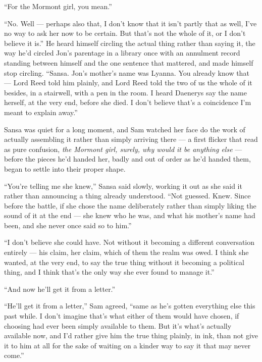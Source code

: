 “For the Mormont girl, you mean.”

“No. Well — perhaps also that, I don’t know that it isn’t partly that as well, I’ve no way to ask her now to be certain. But that’s not the whole of it, or I don’t believe it is.” He heard himself circling the actual thing rather than saying it, the way he’d circled Jon’s parentage in a library once with an annulment record standing between himself and the one sentence that mattered, and made himself stop circling. “Sansa. Jon’s mother’s name was Lyanna. You already know that — Lord Reed told him plainly, and Lord Reed told the two of us the whole of it besides, in a stairwell, with a pen in the room. I heard Daenerys say the name herself, at the very end, before she died. I don’t believe that’s a coincidence I’m meant to explain away.”

Sansa was quiet for a long moment, and Sam watched her face do the work of actually assembling it rather than simply arriving there — a first flicker that read as pure confusion, \textit{the Mormont girl, surely, why would it be anything else} — before the pieces he’d handed her, badly and out of order as he’d handed them, began to settle into their proper shape.

“You’re telling me she knew,” Sansa said slowly, working it out as she said it rather than announcing a thing already understood. “Not guessed. Knew. Since before the battle, if she chose the name deliberately rather than simply liking the sound of it at the end — she knew who he was, and what his mother’s name had been, and she never once said so to him.”

“I don’t believe she could have. Not without it becoming a different conversation entirely — his claim, her claim, which of them the realm was owed. I think she wanted, at the very end, to say the true thing without it becoming a political thing, and I think that’s the only way she ever found to manage it.”

“And now he’ll get it from a letter.”

“He’ll get it from a letter,” Sam agreed, “same as he’s gotten everything else this past while. I don’t imagine that’s what either of them would have chosen, if choosing had ever been simply available to them. But it’s what’s actually available now, and I’d rather give him the true thing plainly, in ink, than not give it to him at all for the sake of waiting on a kinder way to say it that may never come.”

\sceneBreak

